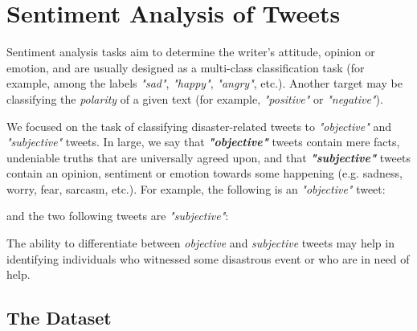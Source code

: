 \documentclass[letterpaper,twocolumn,10pt]{article}
\begin{document}
\section{Sentiment Analysis of Tweets}  \label{mission2}

Sentiment analysis tasks aim to determine the writer's attitude, opinion or emotion, and are usually designed as a multi-class classification task (for example, among the labels \textit{"sad"}, \textit{"happy"}, \textit{"angry"}, etc.). Another target may be classifying the \textit{polarity} of a given text (for example, \textit{"positive"} or \textit{"negative"}).

We focused on the task of classifying disaster-related tweets to \textit{"objective"} and \textit{"subjective"} tweets. In large, we say that \textbf{\textit{"objective"}} tweets contain mere facts, undeniable truths that are universally agreed upon, and that \textbf{\textit{"subjective"}} tweets contain an opinion, sentiment or emotion towards some happening (e.g. sadness, worry, fear, sarcasm, etc.). For example, the following is an \textit{"objective"} tweet:

\begin{center}
	\parbox{190pt}{}
\end{center}

and the two following tweets are \textit{"subjective"}:

\begin{center}
	\parbox{190pt}{}
\end{center}

\begin{center}
	\parbox{190pt}{}
\end{center}

The ability to differentiate between \textit{objective} and \textit{subjective} tweets may help in identifying individuals who witnessed some disastrous event or who are in need of help.

\subsection{The Dataset}
\end{document}
